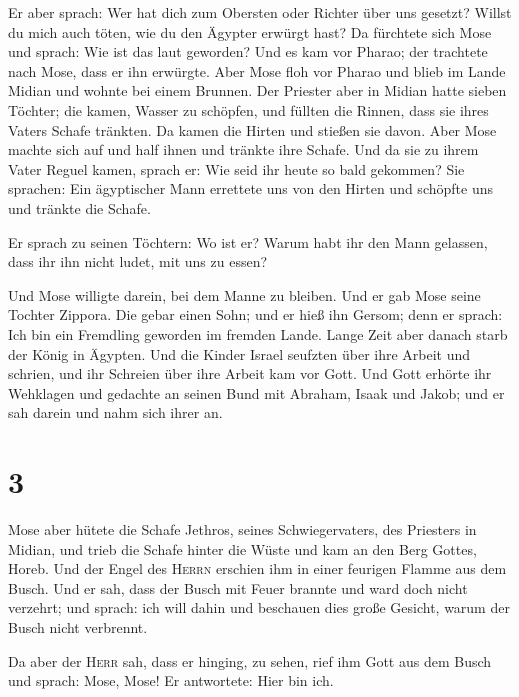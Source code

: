  Er aber sprach: Wer hat dich zum Obersten oder Richter
über uns gesetzt? Willst du mich auch töten, wie du den Ägypter erwürgt
hast? Da fürchtete sich Mose und sprach: Wie ist das laut geworden?
 Und es kam vor Pharao; der trachtete nach Mose, dass er
ihn erwürgte. Aber Mose floh vor Pharao und blieb im Lande Midian und
wohnte bei einem Brunnen.  Der Priester aber in Midian
hatte sieben Töchter; die kamen, Wasser zu schöpfen, und füllten die
Rinnen, dass sie ihres Vaters Schafe tränkten.  Da kamen
die Hirten und stießen sie davon. Aber Mose machte sich auf und half
ihnen und tränkte ihre Schafe.  Und da sie zu ihrem Vater
Reguel kamen, sprach er: Wie seid ihr heute so bald gekommen?
 Sie sprachen: Ein ägyptischer Mann errettete uns von den
Hirten und schöpfte uns und tränkte die Schafe.

 Er sprach zu seinen Töchtern: Wo ist er? Warum habt ihr
den Mann gelassen, dass ihr ihn nicht ludet, mit uns zu essen?

 Und Mose willigte darein, bei dem Manne zu bleiben. Und
er gab Mose seine Tochter Zippora.  Die gebar einen Sohn;
und er hieß ihn Gersom; denn er sprach: Ich bin ein Fremdling geworden
im fremden Lande.  Lange Zeit aber danach starb der König
in Ägypten. Und die Kinder Israel seufzten über ihre Arbeit und schrien,
und ihr Schreien über ihre Arbeit kam vor Gott.  Und Gott
erhörte ihr Wehklagen und gedachte an seinen Bund mit Abraham, Isaak und
Jakob;  und er sah darein und nahm sich ihrer an.

\hypertarget{section-2}{%
\section{3}\label{section-2}}

 Mose aber hütete die Schafe Jethros, seines
Schwiegervaters, des Priesters in Midian, und trieb die Schafe hinter
die Wüste und kam an den Berg Gottes, Horeb.  Und der
Engel des \textsc{Herrn} erschien ihm in einer feurigen Flamme aus dem
Busch. Und er sah, dass der Busch mit Feuer brannte und ward doch nicht
verzehrt;  und sprach: ich will dahin und beschauen dies
große Gesicht, warum der Busch nicht verbrennt.

 Da aber der \textsc{Herr} sah, dass er hinging, zu sehen,
rief ihm Gott aus dem Busch und sprach: Mose, Mose! Er antwortete: Hier
bin ich.

